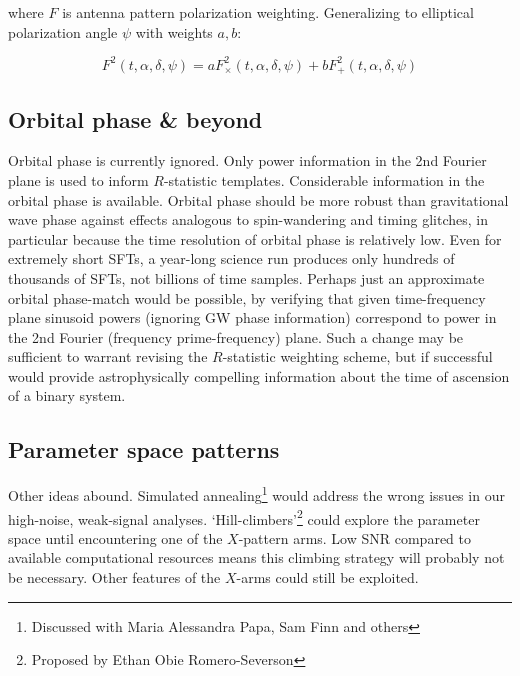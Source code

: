 \noindent where $F$ is antenna pattern polarization weighting.
Generalizing to elliptical polarization angle $\psi$ with weights $a,b$:

\begin{equation}
F^{2}(t,\alpha,\delta,\psi)=aF_{\times}^{2}(t,\alpha,\delta,\psi)+bF_{+}^{2}(t,\alpha,\delta,\psi)
\label{TwoSpect_elliptical_pol}
\end{equation}



\subsection{Orbital phase \& beyond}


Orbital phase is currently ignored.
Only power information in the 2nd Fourier plane is used to inform $R$-statistic templates.
Considerable information in the orbital phase is available.
Orbital phase should be more robust than gravitational wave phase against effects analogous to spin-wandering and timing glitches, in particular because the time resolution of orbital phase is relatively low.
Even for extremely short SFTs, a year-long science run produces only hundreds of thousands of SFTs, not billions of time samples.
Perhaps just an approximate orbital phase-match would be possible, by verifying that given time-frequency plane sinusoid powers (ignoring GW phase information) correspond to power in the 2nd Fourier (frequency prime-frequency) plane.
Such a change may be sufficient to warrant revising the $R$-statistic weighting scheme, but if successful would provide astrophysically compelling information about the time of ascension of a binary system.

\subsection{Parameter space patterns}
Other ideas abound. 
Simulated annealing\footnote{Discussed with Maria Alessandra Papa, Sam Finn and others} would address the wrong issues in our high-noise, weak-signal analyses. 
`Hill-climbers'\footnote{Proposed by Ethan Obie Romero-Severson} could explore the parameter space until encountering one of the $X$-pattern arms. 
Low SNR compared to available computational resources means this climbing strategy will probably not be necessary. 
Other features of the $X$-arms could still be exploited.

